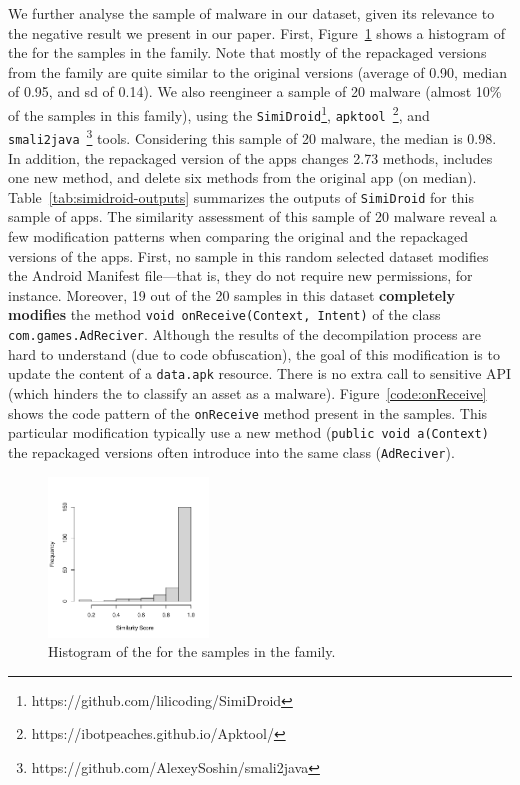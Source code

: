 We further analyse the sample of \gps malware in our dataset, given its
relevance to the negative result we present in our paper. First,
Figure~\ref{fig:hist-gappusin} shows a histogram of the \sscore for the samples
in the \gps family. Note that mostly of the repackaged versions from the
\gps family are quite similar to the original versions (average \sscore
of 0.90, median \sscore of 0.95, and sd of 0.14). We also reengineer
a sample of 20 \gps malware (almost 10\% of the samples in this
family), using the \texttt{SimiDroid}\footnote{https://github.com/lilicoding/SimiDroid},
\texttt{apktool}~\footnote{https://ibotpeaches.github.io/Apktool/},
and \texttt{smali2java}~\footnote{https://github.com/AlexeySoshin/smali2java} tools.
Considering this sample of 20 \gps malware, the median \sscore is 0.98. In addition,
the repackaged version of the apps changes 2.73 methods, includes one new method,
and delete six methods from the original app (on median). Table~\ref{tab:simidroid-outputs} summarizes
the outputs of \texttt{SimiDroid} for this sample of \gps apps. The similarity assessment
of this sample of 20 \gps malware reveal a few modification patterns when comparing the original and the
repackaged versions of the apps. First, no sample in this random selected \gps dataset
modifies the Android Manifest file---that is, they do not require new permissions, for instance.
Moreover, 19 out of the 20 samples in this dataset  {\bf completely modifies} the
method \texttt{void onReceive(Context, Intent)}
of the class \texttt{com.games.AdReciver}. Although the results of the
decompilation process are hard to understand (due to code obfuscation),
the goal of this modification is to update the content of a \texttt{data.apk}
resource. There is no extra call to sensitive API (which hinders the
\mas to classify an asset as a malware). Figure~\ref{code:onReceive} shows
the code pattern of the \texttt{onReceive} method present in the samples. This particular modification
typically use a new method (\texttt{public void a(Context)}
the repackaged versions often introduce into the same class (\texttt{AdReciver}).

\begin{figure}
\begin{center}
    \includegraphics[width=0.38\textwidth]{images/gappusin-1.pdf}
  \end{center}
  \caption{Histogram of the \sscore for the samples in the \gps family.}
  \label{fig:hist-gappusin}
\end{figure}  

